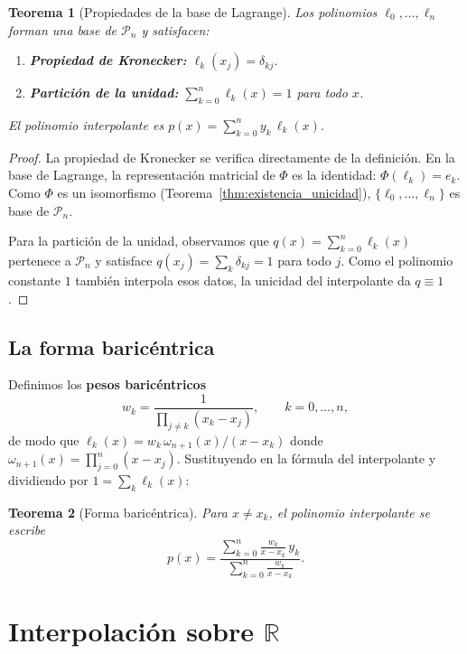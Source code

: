 \documentclass[a4paper,11pt]{report}
\newtheorem{theorem}{Teorema}[chapter]
\begin{document}
\begin{theorem}[Propiedades de la base de Lagrange]\label{thm:base_lagrange}
Los polinomios $\ell_0,\ldots,\ell_n$ forman una base de $\mathcal{P}_n$ y satisfacen:
\begin{enumerate}
\item \textbf{Propiedad de Kronecker:} $\ell_k(x_j) = \delta_{kj}$.
\item \textbf{Partición de la unidad:} $\sum_{k=0}^n \ell_k(x) = 1$ para todo $x$.
\end{enumerate}
El polinomio interpolante es $p(x) = \sum_{k=0}^n y_k\,\ell_k(x)$.
\end{theorem}

\begin{proof}
La propiedad de Kronecker se verifica directamente de la definición.  En la base de Lagrange, la representación matricial de $\Phi$ es la identidad: $\Phi(\ell_k) = e_k$.  Como $\Phi$ es un isomorfismo (Teorema~\ref{thm:existencia_unicidad}), $\{\ell_0,\ldots,\ell_n\}$ es base de $\mathcal{P}_n$.

Para la partición de la unidad, observamos que $q(x) = \sum_{k=0}^n \ell_k(x)$ pertenece a $\mathcal{P}_n$ y satisface $q(x_j) = \sum_k \delta_{kj} = 1$ para todo $j$.  Como el polinomio constante $1$ también interpola esos datos, la unicidad del interpolante da $q\equiv 1$.
\end{proof}

\subsection{La forma baricéntrica}\label{subsec:forma_baricentrica}

Definimos los \textbf{pesos baricéntricos}
\[
w_k = \frac{1}{\prod_{j\neq k}(x_k - x_j)}, \qquad k=0,\ldots,n,
\]
de modo que $\ell_k(x) = w_k\,\omega_{n+1}(x)/(x-x_k)$ donde $\omega_{n+1}(x) = \prod_{j=0}^n(x-x_j)$.  Sustituyendo en la fórmula del interpolante y dividiendo por $1 = \sum_k \ell_k(x)$:

\begin{theorem}[Forma baricéntrica]\label{thm:forma_baricentrica}
Para $x\neq x_k$, el polinomio interpolante se escribe
\[
p(x) = \frac{\displaystyle\sum_{k=0}^n \frac{w_k}{x-x_k}\,y_k}{\displaystyle\sum_{k=0}^n \frac{w_k}{x-x_k}}.
\]
\end{theorem}

\section{Interpolación sobre $\mathbb{R}$}\label{sec:interpolacion_R}
\end{document}
